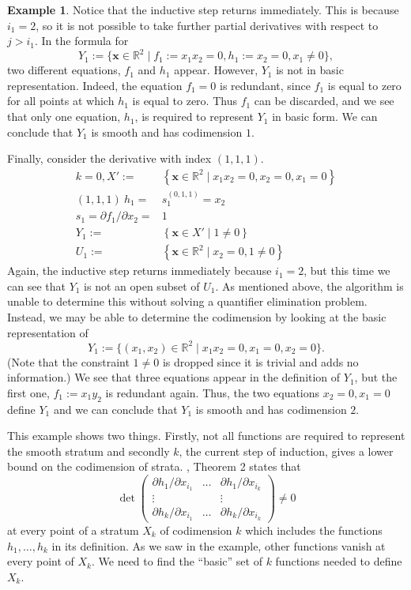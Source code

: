 \documentclass[
]{book}
\theoremstyle{definition}
\theoremstyle{definition}
\newtheorem{example}{Example}[chapter]
\theoremstyle{definition}
\theoremstyle{definition}
\theoremstyle{remark}
\begin{document}
\begin{example}
Notice that the inductive step returns immediately. This is because \(i_1=2\), so it is not possible to take further partial derivatives with respect to \(j > i_1\). In the formula for
\[
Y_1 := \{ \mathbf{x} \in \mathbb{R}^2 \mid f_1 := x_1 x_2 = 0, h_1 := x_2 = 0, x_1 \ne 0 \},
\]
two different equations, \(f_1\) and \(h_1\) appear. However, \(Y_1\) is not in basic representation. Indeed, the equation \(f_1=0\) is redundant, since \(f_1\) is equal to zero for all points at which \(h_1\) is equal to zero. Thus \(f_1\) can be discarded, and we see that only one equation, \(h_1\), is required to represent \(Y_1\) in basic form. We can conclude that \(Y_1\) is smooth and has codimension \(1\).

Finally, consider the derivative with index \((1,1,1)\).
\begin{align*}
k=0,X':=&\left\{ \mathbf{x}\in\mathbb{R}^{2}\mid x_{1}x_{2}=0,x_{2}=0,x_{1}=0\right\} \\\left(1,1,1\right)\ h_{1}=&s_{1}^{\left(0,1,1\right)}=x_{2}\\s_{1}=\partial f_{1}/\partial x_{2}=&1\\Y_{1}:=&\left\{ \mathbf{x}\in X'\mid1\ne0\right\} \\U_{1}:=&\left\{ \mathbf{x}\in\mathbb{R}^{2}\mid x_{2}=0,1\ne0\right\}
\end{align*}
Again, the inductive step returns immediately because \(i_1=2\), but this time we can see that \(Y_1\) is not an open subset of \(U_1\). As mentioned above, the algorithm is unable to determine this without solving a quantifier elimination problem. Instead, we may be able to determine the codimension by looking at the basic representation of \[
Y_1 := \{ (x_1,x_2) \in \mathbb{R}^2 \mid x_1 x_2 = 0, x_1 = 0, x_2 = 0 \}.
\]
(Note that the constraint \(1 \ne 0\) is dropped since it is trivial and adds no information.)
We see that three equations appear in the definition of \(Y_1\), but the first one, \(f_1 := x_1 y_2\) is redundant again. Thus, the two equations \(x_2 = 0, x_1 = 0\) define \(Y_1\) and we can conclude that \(Y_1\) is smooth and has codimension \(2\).
\end{example}

This example shows two things. Firstly, not all functions are required to represent the smooth stratum and secondly \(k\), the current step of induction, gives a lower bound on the codimension of strata.
\citet{gv1995}, Theorem 2 states that
\[
\det\begin{pmatrix}\partial h_{1}/\partial x_{i_{1}} & \ldots & \partial h_{1}/\partial x_{i_{k}}\\
\vdots &  & \vdots\\
\partial h_{k}/\partial x_{i_{1}} & \ldots & \partial h_{k}/\partial x_{i_{k}}
\end{pmatrix}\ne0
\]
at every point of a stratum \(X_k\) of codimension \(k\) which includes the functions \(h_1,\ldots,h_k\) in its definition.
As we saw in the example, other functions vanish at every point of \(X_k\). We need to find the ``basic'' set of \(k\) functions needed to define \(X_k\).
\end{document}

